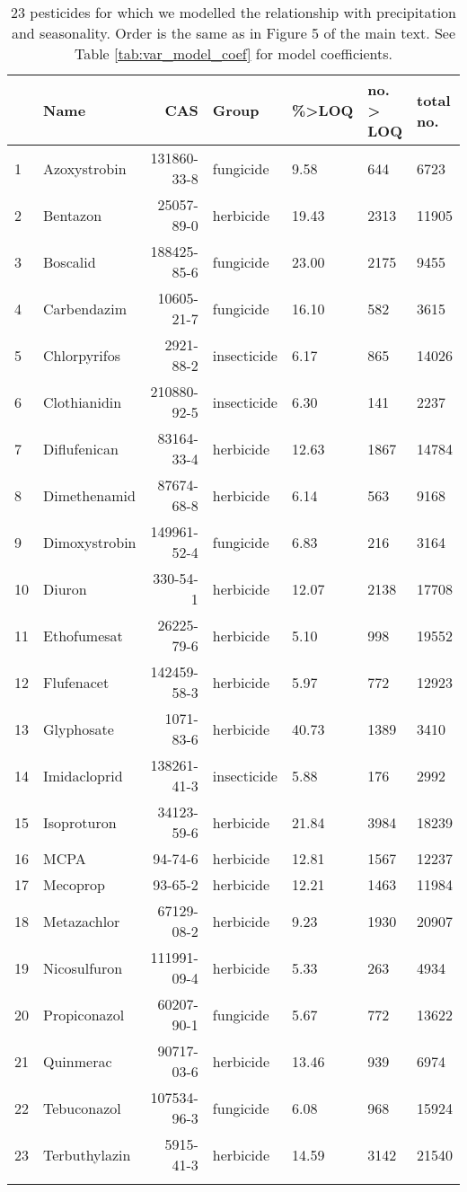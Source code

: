 \begin{longtable}{lp{2.5cm}rlp{1.5cm}p{2cm}p{2cm}}
\caption[23 pesticides for which we modelled the relationship with precipitation and seasonality.]{23 pesticides for which we modelled the relationship with precipitation and seasonality.
                    Order is the same as in Figure 5 of the main text. See Table \ref{tab:var_model_coef} for model coefficients.} \\ 
  \toprule
 & Name & CAS & Group & \%>LOQ & no. > LOQ & total no. \\ 
  \midrule
1 & Azoxystrobin & 131860-33-8 & fungicide & 9.58 & 644 & 6723 \\ 
  2 & Bentazon & 25057-89-0 & herbicide & 19.43 & 2313 & 11905 \\ 
  3 & Boscalid & 188425-85-6 & fungicide & 23.00 & 2175 & 9455 \\ 
  4 & Carbendazim & 10605-21-7 & fungicide & 16.10 & 582 & 3615 \\ 
  5 & Chlorpyrifos & 2921-88-2 & insecticide & 6.17 & 865 & 14026 \\ 
  6 & Clothianidin & 210880-92-5 & insecticide & 6.30 & 141 & 2237 \\ 
  7 & Diflufenican & 83164-33-4 & herbicide & 12.63 & 1867 & 14784 \\ 
  8 & Dimethenamid & 87674-68-8 & herbicide & 6.14 & 563 & 9168 \\ 
  9 & Dimoxystrobin & 149961-52-4 & fungicide & 6.83 & 216 & 3164 \\ 
  10 & Diuron & 330-54-1 & herbicide & 12.07 & 2138 & 17708 \\ 
  11 & Ethofumesat & 26225-79-6 & herbicide & 5.10 & 998 & 19552 \\ 
  12 & Flufenacet & 142459-58-3 & herbicide & 5.97 & 772 & 12923 \\ 
  13 & Glyphosate & 1071-83-6 & herbicide & 40.73 & 1389 & 3410 \\ 
  14 & Imidacloprid & 138261-41-3 & insecticide & 5.88 & 176 & 2992 \\ 
  15 & Isoproturon & 34123-59-6 & herbicide & 21.84 & 3984 & 18239 \\ 
  16 & MCPA & 94-74-6 & herbicide & 12.81 & 1567 & 12237 \\ 
  17 & Mecoprop & 93-65-2 & herbicide & 12.21 & 1463 & 11984 \\ 
  18 & Metazachlor & 67129-08-2 & herbicide & 9.23 & 1930 & 20907 \\ 
  19 & Nicosulfuron & 111991-09-4 & herbicide & 5.33 & 263 & 4934 \\ 
  20 & Propiconazol & 60207-90-1 & fungicide & 5.67 & 772 & 13622 \\ 
  21 & Quinmerac & 90717-03-6 & herbicide & 13.46 & 939 & 6974 \\ 
  22 & Tebuconazol & 107534-96-3 & fungicide & 6.08 & 968 & 15924 \\ 
  23 & Terbuthylazin & 5915-41-3 & herbicide & 14.59 & 3142 & 21540 \\ 
   \bottomrule
\label{tab:var_model}
\end{longtable}
